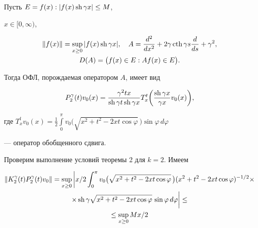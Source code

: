 \begin{exam}


Пусть $E=f(x):|f(x) \operatorname{sh} \gamma x| \leq M$,


$x\in [0,\infty )$,


\begin{gather*}


\| f(x) \|=\sup_{x \geq 0}


|f(x) \sh \gamma x|,\quad A=\frac{d^2}{dx^2}+


2\gamma\cth \gamma s \frac{d}{ds}+\gamma^2,\\


%


D(A)=\big(f(x)\in E: Af(x)\in E \big).


\end{gather*}





Тогда ОФЛ, порождаемая оператором $A$, имеет вид


$$


P_2^\gamma(t)v_0(x)=\frac{\gamma^{2}tx}{\sh \gamma t\sh \gamma x}


T_x^t\bigg(\frac{\sh \gamma x}{\gamma x}v_0(x)\bigg),


$$


где $T_x^tv_0(x)=\frac{1}{2} \int\limits_0^\pi


v_0\big(\sqrt{x^2+t^2-2xt \cos \varphi}\,\big) \sin \varphi\, d\varphi$


--- оператор обобщенного сдвига.





Проверим выполнение условий теоремы 2 для $k=2$. Имеем


\begin{multline*}


\| K_2^\gamma(t)P_2^\gamma(t)v_0\|=\sup_{x \geq 0}


\bigg| x/2 \int_0^\pi


v_0\big(\sqrt{x^2+t^2-2xt \cos \varphi}\,\big)


(x^2+t^2-2xt \cos \varphi)^{-1/2} \times \\


%


\times\sh \gamma\sqrt{x^2+t^2-2xt


\cos \varphi}\, \sin \varphi\, d\varphi\bigg|\leq \\


%


\le \sup_{x \geq 0}Mx/2



\end{multline*}
\end{exam}
